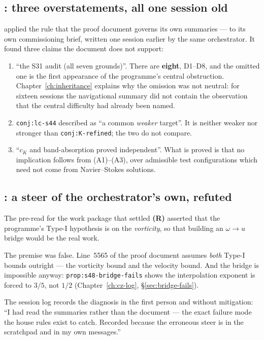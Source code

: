 \subsection{\texorpdfstring{: three overstatements, all one session old}{S47: three overstatements, all one session old}}

 applied the rule that the proof document governs its own summaries ---
to its own commissioning brief, written one session earlier by the same
orchestrator. It found three claims the document does not support:

\begin{enumerate}[label=(\roman*),leftmargin=2.4em]
\item ``the S31 audit (all seven grounds)''. There are \textbf{eight},
  D1--D8, and the omitted one is the first appearance of the programme's
  central obstruction. Chapter~\ref{ch:inheritance} explains why the omission
  was not neutral: for sixteen sessions the navigational summary did not
  contain the observation that the central difficulty had already been named.
\item \texttt{conj:lc-s44} described as ``a common \emph{weaker} target''. It
  is neither weaker nor stronger than \texttt{conj:K-refined}; the two do not
  compare.
\item ``\(c_K\) and band-absorption proved independent''. What is proved is
  that no implication follows from (A1)--(A3), over admissible test
  configurations which need not come from Navier--Stokes solutions.
\end{enumerate}

\subsection{\texorpdfstring{: a steer of the orchestrator's own, refuted}{S48: a steer of the orchestrator's own, refuted}}

\begin{record}
The  pre-read for the work package that settled \textbf{(R)} asserted
that the programme's Type-I hypothesis is on the \emph{vorticity}, so that
building an \(\omega\to u\) bridge would be the real work.

\smallskip
The premise was false. Line~5565 of the proof document assumes \emph{both}
Type-I bounds outright --- the vorticity bound and the velocity bound. And the
bridge is impossible anyway: \texttt{prop:s48-bridge-fails} shows the
interpolation exponent is forced to \(3/5\), not \(1/2\)
(Chapter~\ref{ch:cz-log}, \S\ref{sec:bridge-fails}).

\smallskip
The session log records the diagnosis in the first person and without
mitigation: ``I had read the summaries rather than the document --- the exact
failure mode the house rules exist to catch. Recorded because the erroneous
steer is in the scratchpad and in my own messages.''
\end{record}

